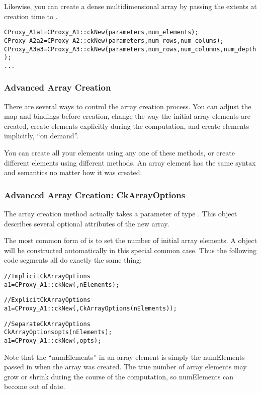 Likewise, you can create a dense multidimensional array by passing the extents at creation time to .

\begin{alltt}
CProxy_A1 a1 = CProxy_A1::ckNew(parameters ,num_elements);
CProxy_A2 a2 = CProxy_A2::ckNew(parameters, num_rows, num_colums);
CProxy_A3 a3 = CProxy_A3::ckNew(parameters, num_rows, num_columns, num_depth);
...
\end{alltt}

\subsubsection{Advanced Array Creation}
\label{advanced array create}
There are several ways to control the array creation process.
You can adjust the map and bindings before creation, change
the way the initial array elements are created, create elements
explicitly during the computation, and create elements implicitly,
``on demand''.  

You can create all your elements using any one of these methods,
or create different elements using different methods.  
An array element has the same syntax and semantics no matter
how it was created.


\subsubsection{Advanced Array Creation: CkArrayOptions}
\label{CkArrayOptions}

The array creation method  actually takes a parameter
of type .  This object describes several
optional attributes of the new array.

The most common form of  is to set the number
of initial array elements.  A  object will be 
constructed automatically in this special common case.  Thus
the following code segments all do exactly the same thing:

\begin{alltt}
//Implicit CkArrayOptions
  a1=CProxy_A1::ckNew(,nElements);

//Explicit CkArrayOptions
  a1=CProxy_A1::ckNew(,CkArrayOptions(nElements));

//Separate CkArrayOptions
  CkArrayOptions opts(nElements);
  a1=CProxy_A1::ckNew(,opts);
\end{alltt}

Note that the ``numElements'' in an array element is simply
the numElements passed in when the array was created.
The true number of array elements may grow or shrink during 
the course of the computation, so numElements can become 
out of date. 


